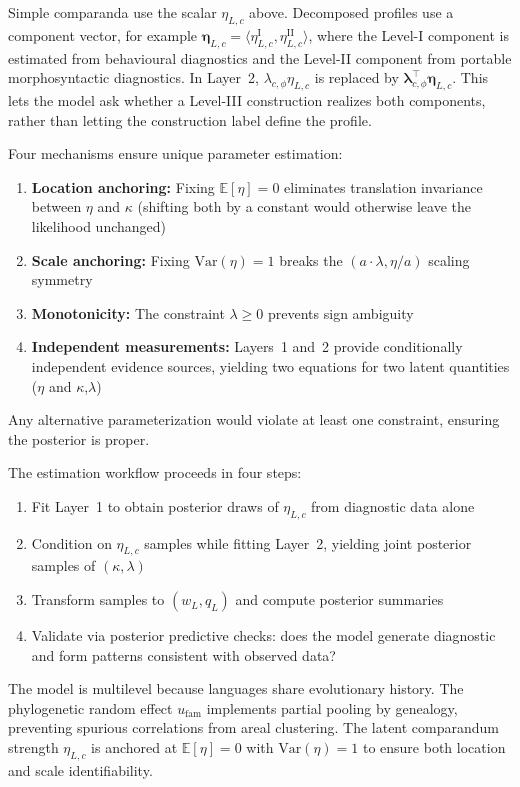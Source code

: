 \documentclass[12pt]{article}
\begin{document}
Simple comparanda use the scalar $\eta_{L,c}$ above. Decomposed profiles use a component vector, for example $\boldsymbol{\eta}_{L,c}=\langle \eta^{\mathrm{I}}_{L,c}, \eta^{\mathrm{II}}_{L,c}\rangle$, where the Level-I component is estimated from behavioural diagnostics and the Level-II component from portable morphosyntactic diagnostics. In Layer~2, $\lambda_{c,\phi}\eta_{L,c}$ is replaced by $\boldsymbol{\lambda}_{c,\phi}^{\top}\boldsymbol{\eta}_{L,c}$. This lets the model ask whether a Level-III construction realizes both components, rather than letting the construction label define the profile.

Four mechanisms ensure unique parameter estimation:
\begin{enumerate}
  \item \textbf{Location anchoring:} Fixing $\mathbb{E}[\eta]=0$ eliminates translation invariance between $\eta$ and $\kappa$ (shifting both by a constant would otherwise leave the likelihood unchanged)
  \item \textbf{Scale anchoring:} Fixing $\text{Var}(\eta)=1$ breaks the $(a \cdot \lambda, \eta/a)$ scaling symmetry
  \item \textbf{Monotonicity:} The constraint $\lambda \geq 0$ prevents sign ambiguity
  \item \textbf{Independent measurements:} Layers~1 and~2 provide conditionally independent evidence sources, yielding two equations for two latent quantities ($\eta$ and $\kappa$,$\lambda$)
\end{enumerate}

Any alternative parameterization would violate at least one constraint, ensuring the posterior is proper.

The estimation workflow proceeds in four steps:
\begin{enumerate}
  \item Fit Layer~1 to obtain posterior draws of $\eta_{L,c}$ from diagnostic data alone
  \item Condition on $\eta_{L,c}$ samples while fitting Layer~2, yielding joint posterior samples of $(\kappa, \lambda)$
  \item Transform samples to $(w_L, q_L)$ and compute posterior summaries
  \item Validate via posterior predictive checks: does the model generate diagnostic and form patterns consistent with observed data?
\end{enumerate}

The model is multilevel because languages share evolutionary history. The phylogenetic random effect $u_{\text{fam}}$ implements partial pooling by genealogy, preventing spurious correlations from areal clustering. The latent comparandum strength $\eta_{L,c}$ is anchored at $\mathbb{E}[\eta]=0$ with $\text{Var}(\eta)=1$ to ensure both location and scale identifiability.
\end{document}
